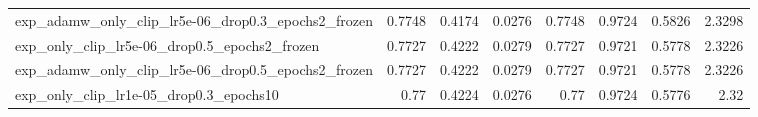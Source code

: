 \documentclass[a4paper,oneside,bibliography=totoc]{scrbook}
\begin{document}
\begin{landscape}
\begin{center}
\begin{longtable}{p{4cm} *{7}{r}}
        exp\_adamw\_only\_clip\_lr5e-06\_drop0.3\_epochs2\_frozen & 0.7748 & 0.4174 & 0.0276 & 0.7748 & 0.9724 & 0.5826 & 2.3298 \\ 
        exp\_only\_clip\_lr5e-06\_drop0.5\_epochs2\_frozen & 0.7727 & 0.4222 & 0.0279 & 0.7727 & 0.9721 & 0.5778 & 2.3226 \\ 
        exp\_adamw\_only\_clip\_lr5e-06\_drop0.5\_epochs2\_frozen & 0.7727 & 0.4222 & 0.0279 & 0.7727 & 0.9721 & 0.5778 & 2.3226 \\ 
        exp\_only\_clip\_lr1e-05\_drop0.3\_epochs10 & 0.77 & 0.4224 & 0.0276 & 0.77 & 0.9724 & 0.5776 & 2.32 \\ 

\end{longtable}
\end{center}
\end{landscape}

\scriptsize  %
\setlength{\tabcolsep}{2pt}  %
\end{document}
